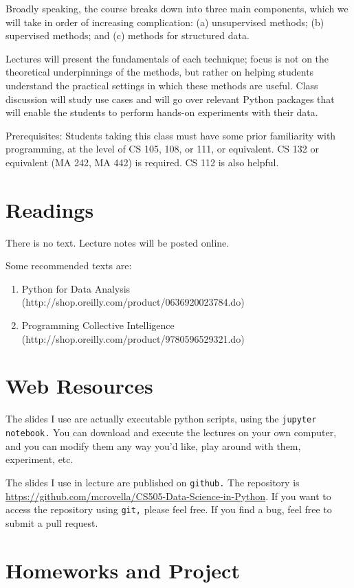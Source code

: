 \documentclass[11pt]{article}
\begin{document}
Broadly speaking, the course breaks down into three main components,
which we will take in order of increasing complication:  (a)
unsupervised methods; (b) supervised methods; and (c) methods for
structured data.

Lectures will present the fundamentals of each technique; focus is not
on the theoretical underpinnings of the methods, but rather on helping
students understand the practical settings in which these methods are
useful.  Class discussion will study use cases and will go over relevant
Python packages that will enable the students to perform hands-on
experiments with their data. 

Prerequisites: Students taking this class must have some prior familiarity with
programming, at the level of CS 105, 108, or 111, or equivalent.   CS
132 or equivalent (MA 242, MA 442) is required.  CS 112 is also helpful.

\section*{Readings} 

There is no text.   Lecture notes will be posted online.

Some recommended texts are:
\begin{enumerate}
\item Python for Data Analysis
  (http://shop.oreilly.com/product/0636920023784.do)
\item Programming Collective Intelligence (http://shop.oreilly.com/product/9780596529321.do)
\end{enumerate}

\section*{Web Resources} 

The slides I use are actually executable python scripts, using the
\texttt{jupyter notebook.}   You can
download and execute the lectures on your own computer, and you can
modify them any way you'd like, play around with them, experiment, etc.

The slides I use in lecture are published on \texttt{github.}   The
repository is
\url{https://github.com/mcrovella/CS505-Data-Science-in-Python}.  If you want
to access the repository using \texttt{git,} please feel free.   If you
find a bug, feel free to submit a pull request.
 
\section*{Homeworks and Project}
\end{document}
